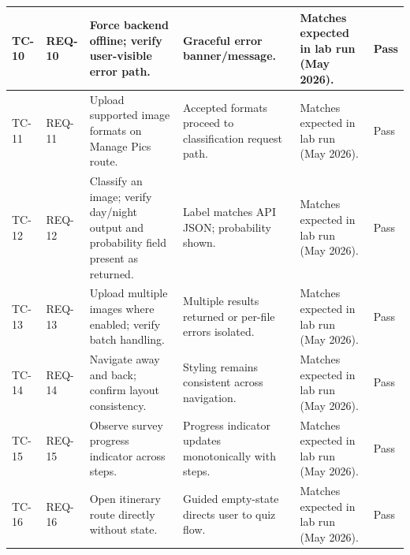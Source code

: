 \documentclass[12pt,oneside,openany]{report}
\begin{document}
\begin{longtable}{|p{}|p{}|p{}|p{}|p{}|p{}|}
\hline
TC-10 & REQ-10 & Force backend offline; verify user-visible error path. & Graceful error banner/message. & Matches expected in lab run (May 2026). & Pass \\
\hline
TC-11 & REQ-11 & Upload supported image formats on Manage Pics route. & Accepted formats proceed to classification request path. & Matches expected in lab run (May 2026). & Pass \\
\hline
TC-12 & REQ-12 & Classify an image; verify day/night output and probability field present as returned. & Label matches API JSON; probability shown. & Matches expected in lab run (May 2026). & Pass \\
\hline
TC-13 & REQ-13 & Upload multiple images where enabled; verify batch handling. & Multiple results returned or per-file errors isolated. & Matches expected in lab run (May 2026). & Pass \\
\hline
TC-14 & REQ-14 & Navigate away and back; confirm layout consistency. & Styling remains consistent across navigation. & Matches expected in lab run (May 2026). & Pass \\
\hline
TC-15 & REQ-15 & Observe survey progress indicator across steps. & Progress indicator updates monotonically with steps. & Matches expected in lab run (May 2026). & Pass \\
\hline
TC-16 & REQ-16 & Open itinerary route directly without state. & Guided empty-state directs user to quiz flow. & Matches expected in lab run (May 2026). & Pass \\
\hline
\end{longtable}
\end{document}
